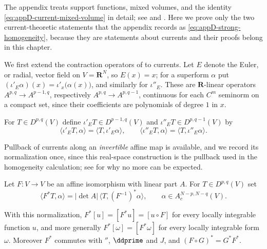 The appendix treats support functions, mixed volumes, and the identity
\eqref{eq:appD-current-mixed-volume} in detail; see
 and
.  Here we prove only the two
current-theoretic statements that the appendix records as
\eqref{eq:appD-strong-homogeneity}, because they are statements about
currents and their proofs belong in this chapter.

We first extend the contraction operators of  to
currents.  Let $E$ denote the Euler, or radial, vector field on
$V=\mathbf R^N$, so $E(x)=x$; for a superform $\alpha$ put
$(\iota'_E\alpha)(x)=\iota'_{x}\bigl(\alpha(x)\bigr)$, and similarly for
$\iota''_E$.  These are $\mathbf R$-linear operators
$A^{p,q}\to A^{p-1,q}$, respectively $A^{p,q}\to A^{p,q-1}$, continuous for
each $C^m$ seminorm on a compact set, since their coefficients are
polynomials of degree $1$ in $x$.

\begin{definition}
\label{def:ch14-radial-contraction}
For $T\in D^{p,q}(V)$ define $\iota'_ET\in D^{p-1,q}(V)$ and
$\iota''_ET\in D^{p,q-1}(V)$ by
\[
 \langle\iota'_ET,\alpha\rangle=\langle T,\iota'_E\alpha\rangle,
 \qquad
 \langle\iota''_ET,\alpha\rangle=\langle T,\iota''_E\alpha\rangle .
\]
\end{definition}

Pullback of currents along an \emph{invertible} affine map is available, and
we record its normalization once, since this real-space construction is the pullback used in the
homogeneity calculation; see  for why no more can
be expected.

\begin{definition}
\label{def:ch14-affine-pullback}
Let $F:V\to V$ be an affine isomorphism with linear part $A$.  For
$T\in D^{p,q}(V)$ set
\[
 \langle F^*T,\alpha\rangle
 =|\det A|\,\bigl\langle T,(F^{-1})^*\alpha\bigr\rangle,
 \qquad\alpha\in A_c^{N-p,N-q}(V).
\]
\end{definition}

\begin{lemma}
\label{lem:ch14-affine-pullback-compat}
With this normalization, $F^*[u]=[F^*u]=[u\circ F]$ for every locally
integrable function $u$, and more generally $F^*[\omega]=[F^*\omega]$ for
every locally integrable form $\omega$.  Moreover $F^*$ commutes with
$\dprime$, $\ddprime$ and $J$, and $(F\circ G)^*=G^*F^*$.
\end{lemma}

